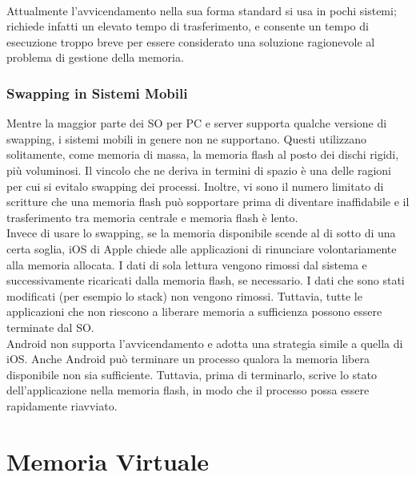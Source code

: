 \documentclass{article}
\begin{document}
				\\Attualmente l’avvicendamento nella sua forma standard si usa in pochi sistemi; richiede infatti un elevato tempo di trasferimento, e consente un tempo di esecuzione troppo breve per essere considerato una soluzione ragionevole al problema di gestione della memoria.

			\subsubsection{Swapping in Sistemi Mobili}
				Mentre la maggior parte dei SO per PC e server supporta qualche versione di swapping, i sistemi mobili in genere non ne supportano. Questi utilizzano solitamente, come memoria di massa, la memoria flash al posto dei dischi rigidi, più voluminosi. Il vincolo che ne deriva in termini di spazio è una delle ragioni per cui si evitalo swapping dei processi. Inoltre, vi sono il numero limitato di scritture che una memoria flash può sopportare prima di diventare inaffidabile e il trasferimento tra memoria centrale e memoria flash è lento.
				\\Invece di usare lo swapping, se la memoria disponibile scende al di sotto di una certa soglia, iOS di Apple chiede alle applicazioni di rinunciare volontariamente alla memoria allocata. I dati di sola lettura vengono rimossi dal sistema e successivamente ricaricati dalla memoria flash, se necessario. I dati che sono stati modificati (per esempio lo stack) non vengono rimossi. Tuttavia, tutte le applicazioni che non riescono a liberare memoria a sufficienza possono essere terminate dal SO.
				\\Android non supporta l’avvicendamento e adotta una strategia simile a quella di iOS. Anche Android può terminare un processo qualora la memoria libera disponibile non sia sufficiente. Tuttavia, prima di terminarlo, scrive lo stato dell’applicazione nella memoria flash, in modo che il processo possa essere rapidamente riavviato.

	\section{Memoria Virtuale}
		
\end{document}

